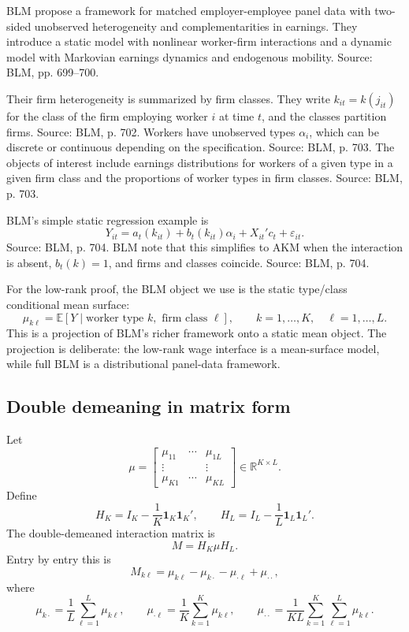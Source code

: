 \documentclass[11pt]{article}
\newcommand{\E}{\mathbb{E}}
\newcommand{\R}{\mathbb{R}}
\newcommand{\one}{\mathbf{1}}
\begin{document}
BLM propose a framework for matched employer-employee panel data with two-sided
unobserved heterogeneity and complementarities in earnings. They introduce a
static model with nonlinear worker-firm interactions and a dynamic model with
Markovian earnings dynamics and endogenous mobility. Source: BLM, pp. 699--700.

Their firm heterogeneity is summarized by firm classes. They write
\(k_{it}=k(j_{it})\) for the class of the firm employing worker \(i\) at time
\(t\), and the classes partition firms. Source: BLM, p. 702. Workers have
unobserved types \(\alpha_i\), which can be discrete or continuous depending on
the specification. Source: BLM, p. 703. The objects of interest include
earnings distributions for workers of a given type in a given firm class and
the proportions of worker types in firm classes. Source: BLM, p. 703.

BLM's simple static regression example is
\[
Y_{it}
=
a_t(k_{it})+b_t(k_{it})\alpha_i+X_{it}'c_t+\varepsilon_{it}.
\tag{BLM-simple}
\]
Source: BLM, p. 704. BLM note that this simplifies to AKM when the interaction
is absent, \(b_t(k)=1\), and firms and classes coincide. Source: BLM, p. 704.

For the low-rank proof, the BLM object we use is the static type/class
conditional mean surface:
\[
\mu_{k\ell}
=
\E[Y\mid \text{worker type }k,\text{ firm class }\ell],
\qquad
k=1,\ldots,K,\quad \ell=1,\ldots,L.
\tag{BLM-mean}
\]
This is a projection of BLM's richer framework onto a static mean object. The
projection is deliberate: the low-rank wage interface is a mean-surface model,
while full BLM is a distributional panel-data framework.

\subsection{Double demeaning in matrix form}

Let
\[
\mu
=
\begin{bmatrix}
\mu_{11} & \cdots & \mu_{1L}\\
\vdots   &        & \vdots\\
\mu_{K1} & \cdots & \mu_{KL}
\end{bmatrix}
\in \R^{K\times L}.
\]
Define
\[
H_K=I_K-\frac{1}{K}\one_K\one_K',
\qquad
H_L=I_L-\frac{1}{L}\one_L\one_L'.
\]
The double-demeaned interaction matrix is
\[
M
=
H_K\mu H_L.
\tag{DD-matrix}
\]
Entry by entry this is
\[
M_{k\ell}
=
\mu_{k\ell}-\mu_{k\cdot}-\mu_{\cdot\ell}+\mu_{\cdot\cdot},
\tag{DD-entry}
\]
where
\[
\mu_{k\cdot}=\frac{1}{L}\sum_{\ell=1}^L\mu_{k\ell},
\qquad
\mu_{\cdot\ell}=\frac{1}{K}\sum_{k=1}^K\mu_{k\ell},
\qquad
\mu_{\cdot\cdot}=\frac{1}{KL}\sum_{k=1}^K\sum_{\ell=1}^L\mu_{k\ell}.
\]
\end{document}
